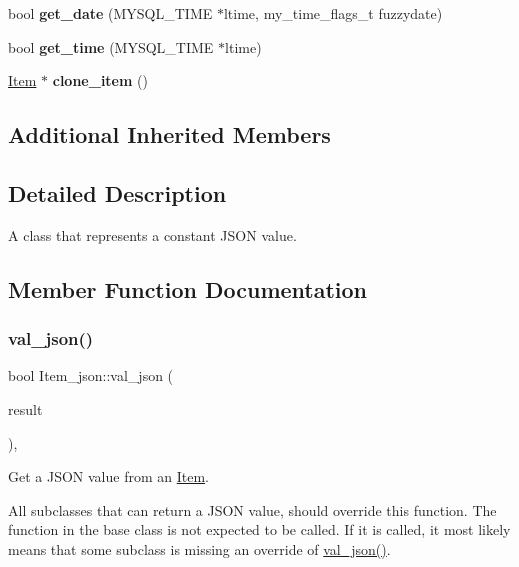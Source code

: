 \begin{DoxyCompactItemize}
\mbox{\label{classItem__json_aa83fd9be4da9fbd3d3538b92c8d029bb}} 
bool {\bfseries get\+\_\+date} (M\+Y\+S\+Q\+L\+\_\+\+T\+I\+ME $\ast$ltime, my\+\_\+time\+\_\+flags\+\_\+t fuzzydate)
\item 
\mbox{\label{classItem__json_aed5f1daf3594b9c476d41859ebeb9011}} 
bool {\bfseries get\+\_\+time} (M\+Y\+S\+Q\+L\+\_\+\+T\+I\+ME $\ast$ltime)
\item 
\mbox{\label{classItem__json_adb5eda4017a050108a73b81726568c5a}} 
\mbox{\hyperlink{classItem}{Item}} $\ast$ {\bfseries clone\+\_\+item} ()
\end{DoxyCompactItemize}
\subsection*{Additional Inherited Members}


\subsection{Detailed Description}
A class that represents a constant J\+S\+ON value. 

\subsection{Member Function Documentation}
\mbox{\label{classItem__json_a002a9253bafc524798d5bc2e5ee1a3d9}} 
\subsubsection{\texorpdfstring{val\+\_\+json()}{val\_json()}}
{\footnotesize\ttfamily bool Item\+\_\+json\+::val\+\_\+json (\begin{DoxyParamCaption}\item[{\mbox{\hyperlink{classJson__wrapper}{Json\+\_\+wrapper}} $\ast$}]{result }\end{DoxyParamCaption})\hspace{0.3cm}{\ttfamily [inline]}, {\ttfamily [virtual]}}

Get a J\+S\+ON value from an \mbox{\hyperlink{classItem}{Item}}.

All subclasses that can return a J\+S\+ON value, should override this function. The function in the base class is not expected to be called. If it is called, it most likely means that some subclass is missing an override of \mbox{\hyperlink{classItem__json_a002a9253bafc524798d5bc2e5ee1a3d9}{val\+\_\+json()}}.


